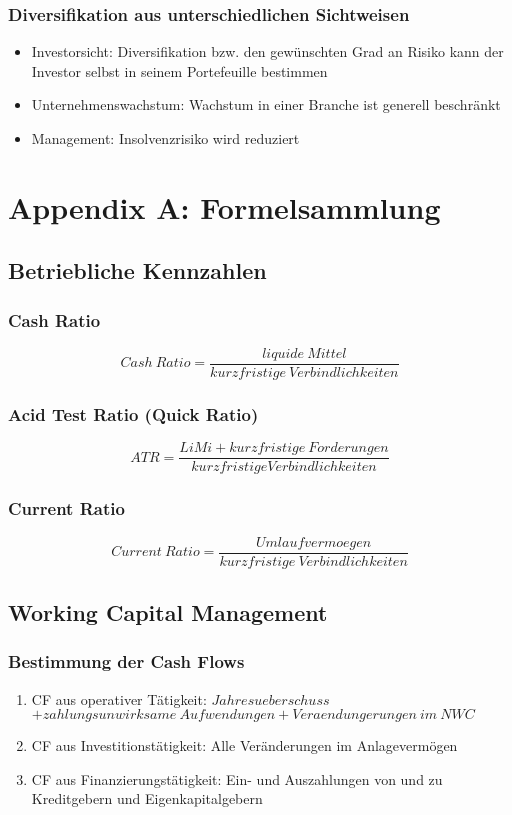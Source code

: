 \subsubsection{Diversifikation aus unterschiedlichen Sichtweisen}
\begin{itemize}
	\item Investorsicht: Diversifikation bzw. den gewünschten Grad an Risiko kann der Investor selbst in seinem Portefeuille bestimmen
	\item Unternehmenswachstum: Wachstum in einer Branche ist generell beschränkt
	\item Management: Insolvenzrisiko wird reduziert
\end{itemize}



\section{Appendix A: Formelsammlung}

\subsection{Betriebliche Kennzahlen}

\subsubsection{Cash Ratio}
\[Cash~Ratio = \frac{liquide~Mittel}{kurzfristige~Verbindlichkeiten}\]

\subsubsection{Acid Test Ratio (Quick Ratio)}
\[ATR = \frac{LiMi + kurzfristige~Forderungen}{kurzfristige Verbindlichkeiten}\]

\subsubsection{Current Ratio}
\[Current~Ratio = \frac{Umlaufvermoegen}{kurzfristige~Verbindlichkeiten}\]


\subsection{Working Capital Management}

\subsubsection{Bestimmung der Cash Flows}
\begin{enumerate}
	\item CF aus operativer Tätigkeit: \(Jahresueberschuss\) \\ \(+ zahlungsunwirksame~Aufwendungen + Veraendungerungen~im~NWC\)
	\item CF aus Investitionstätigkeit: Alle Veränderungen im Anlagevermögen
	\item CF aus Finanzierungstätigkeit: Ein- und Auszahlungen von und zu Kreditgebern und Eigenkapitalgebern
\end{enumerate}

